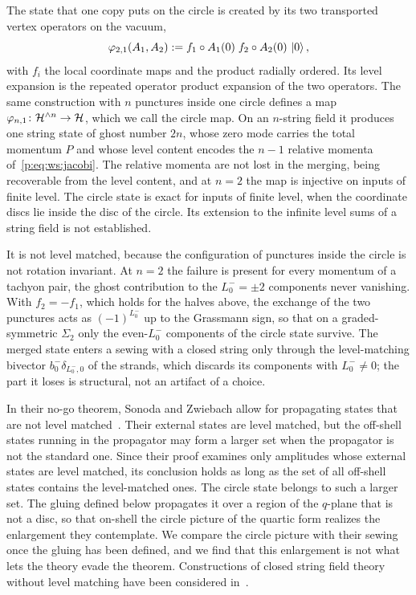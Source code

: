 The state that one copy puts on the circle is created by its two transported vertex operators on the vacuum,
\begin{equation}
  \label{p:eq:ws:circle-map}
  \varphi_{2,1}(A_1, A_2)
    := f_1 \circ A_1(0) \; f_2 \circ A_2(0) \, \ket{0},
\end{equation}
with $f_i$ the local coordinate maps and the product radially ordered.
Its level expansion is the repeated operator product expansion of the two operators.
The same construction with $n$ punctures inside one circle defines a map $\varphi_{n,1} \colon \mathcal{H}^{\wedge n} \to \mathcal{H}$, which we call the circle map.
On an $n$-string field it produces one string state of ghost number $2 n$, whose zero mode carries the total momentum $P$ and whose level content encodes the $n - 1$ relative momenta of~\eqref{p:eq:ws:jacobi}.
The relative momenta are not lost in the merging, being recoverable from the level content, and at $n = 2$ the map is injective on inputs of finite level.
The circle state is exact for inputs of finite level, when the coordinate discs lie inside the disc of the circle.
Its extension to the infinite level sums of a string field is not established.

It is not level matched, because the configuration of punctures inside the circle is not rotation invariant.
At $n = 2$ the failure is present for every momentum of a tachyon pair, the ghost contribution to the $L_0^- = \pm 2$ components never vanishing.
With $f_2 = - f_1$, which holds for the halves above, the exchange of the two punctures acts as $(-1)^{L_0^-}$ up to the Grassmann sign, so that on a graded-symmetric $\Sigma_2$ only the even-$L_0^-$ components of the circle state survive.
The merged state enters a sewing with a closed string only through the level-matching bivector $b_0^- \delta_{L_0^-, 0}$ of the strands, which discards its components with $L_0^- \neq 0$; the part it loses is structural, not an artifact of a choice.


In their no-go theorem, Sonoda and Zwiebach allow for propagating states that are not level matched~\cite[pp.~188--189]{Sonoda:1990:CovariantClosedString}.
Their external states are level matched, but the off-shell states running in the propagator may form a larger set when the propagator is not the standard one.
Since their proof examines only amplitudes whose external states are level matched, its conclusion holds as long as the set of all off-shell states contains the level-matched ones.\footnotemark{}
The circle state belongs to such a larger set.
The gluing defined below propagates it over a region of the $q$-plane that is not a disc, so that on-shell the circle picture of the quartic form realizes the enlargement they contemplate.
We compare the circle picture with their sewing once the gluing has been defined, and we find that this enlargement is not what lets the theory evade the theorem.
Constructions of closed string field theory without level matching have been considered in~\cite{Okawa:2022:ClosedStringField,Erbin:2023:ClosedStringTheory}.

